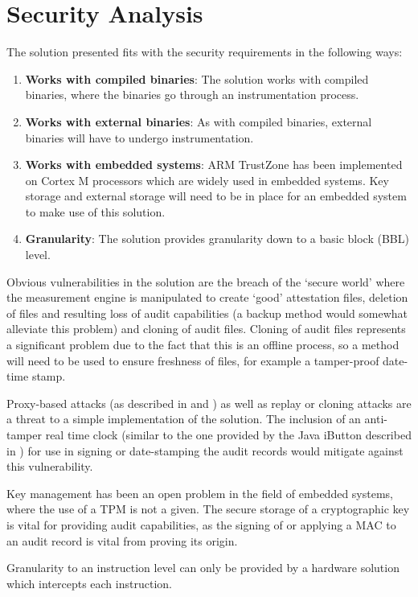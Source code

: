 \section{Security Analysis}

The solution presented fits with the security requirements in the following ways:
\begin{enumerate}
	\item \textbf{Works with compiled binaries}: The solution works with compiled binaries, where the binaries go through an instrumentation process.
	\item \textbf{Works with external binaries}: As with compiled binaries, external binaries will have to undergo instrumentation.
	\item \textbf{Works with embedded systems}: ARM TrustZone has been implemented on Cortex M processors which are widely used in embedded systems. Key storage and external storage will need to be in place for an embedded system to make use of this solution.
	\item \textbf{Granularity}: The solution provides granularity down to a basic block (BBL) level.
\end{enumerate}

Obvious vulnerabilities in the solution are the breach of the `secure world' where the measurement engine is manipulated to create `good' attestation files, deletion of files and resulting loss of audit capabilities (a backup method would somewhat alleviate this problem) and cloning of audit files. Cloning of audit files represents a significant problem due to the fact that this is an offline process, so a method will need to be used to ensure freshness of files, for example a tamper-proof date-time stamp.

Proxy-based attacks (as described in \cite{Seshadri2007} and \cite{Li2011}) as well as replay or cloning attacks are a threat to a simple implementation of the solution. The inclusion of an anti-tamper real time clock (similar to the one provided by the Java iButton described in \cite{Chong2003}) for use in signing or date-stamping the audit records would mitigate against this vulnerability.

Key management has been an open problem in the field of embedded systems, where the use of a TPM is not a given. The secure storage of a cryptographic key is vital for providing audit capabilities, as the signing of or applying a MAC to an audit record is vital from proving its origin.

Granularity to an instruction level can only be provided by a hardware solution which intercepts each instruction.


